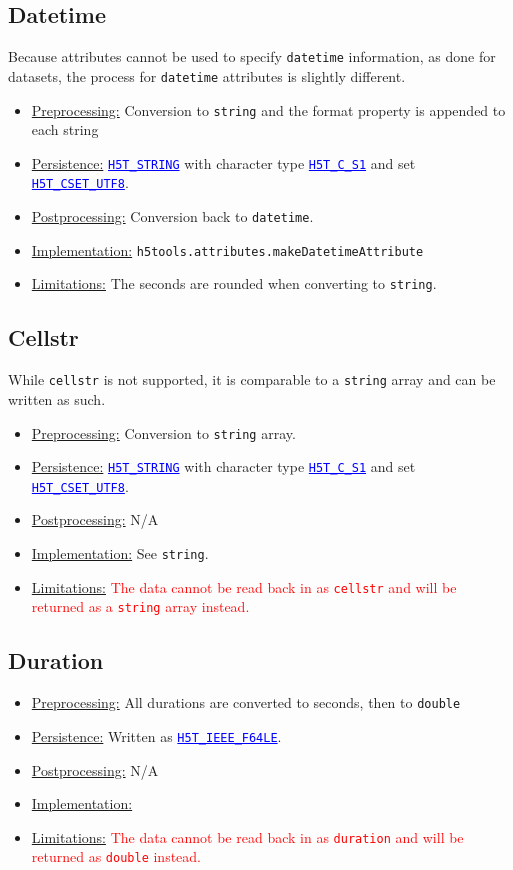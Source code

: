 \documentclass[11pt]{exam}
\newcommand\myurl[1]{\textcolor{blue}{\underline{#1}}}
\newcommand\myfcn[1]{\colorbox{codegray}{\textcolor{codeblue}{\texttt{#1}}}}
\newcommand\hdftype[1]{\texttt{\myurl{#1}}}
\begin{document}
        \subsection{Datetime}
        \noindent Because attributes cannot be used to specify \texttt{datetime} information, as done for datasets, the process for \texttt{datetime} attributes is slightly different.
        \begin{itemize}
            \item \underline{Preprocessing:} Conversion to \texttt{string} and the format property is appended to each string
			\item \underline{Persistence:} \hdftype{H5T\_STRING} with character type \hdftype{H5T\_C\_S1} and set \hdftype{H5T\_CSET\_UTF8}.
			\item \underline{Postprocessing:} Conversion back to \texttt{datetime}.
			\item \underline{Implementation:} \myfcn{h5tools.attributes.makeDatetimeAttribute}
			\item \underline{Limitations:} The seconds are rounded when converting to \texttt{string}. 
		\end{itemize}
		
		\subsection{Cellstr}
		\noindent While \texttt{cellstr} is not supported, it is comparable to a \texttt{string} array and can be written as such.  
		\begin{itemize}
			\item \underline{Preprocessing:} Conversion to \texttt{string} array.
			\item \underline{Persistence:} \hdftype{H5T\_STRING} with character type \hdftype{H5T\_C\_S1} and set \hdftype{H5T\_CSET\_UTF8}.
			\item \underline{Postprocessing:} N/A
			\item \underline{Implementation:} See \texttt{string}.
			\item \underline{Limitations:} \textcolor{red}{The data cannot be read back in as \texttt{cellstr} and will be returned as a \texttt{string} array instead.}
		\end{itemize}

		\subsection{Duration}
		\noindent
		\begin{itemize}
			\item \underline{Preprocessing:} All durations are converted to seconds, then to \texttt{double}
			\item \underline{Persistence:} Written as \hdftype{H5T\_IEEE\_F64LE}.
			\item \underline{Postprocessing:} N/A
			\item \underline{Implementation:} 
			\item \underline{Limitations:} \textcolor{red}{The data cannot be read back in as \texttt{duration} and will be returned as \texttt{double} instead.}
		\end{itemize}
\end{document}
